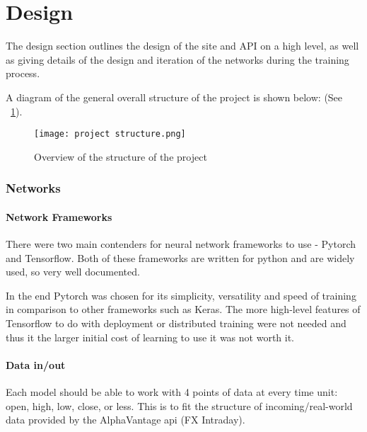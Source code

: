 \newpage
\part{Design}

    \graphicspath{{images/design/}}

    The design section outlines the design of the site and API on a high level, as well as giving details of the design and iteration of the networks during the training process.

    A diagram of the general overall structure of the project is shown below: (See ~\ref{fig:project_structure}).

    \begin{figure}[htbp]
        \centering
        \texttt{[image: project structure.png]}
        \caption{Overview of the structure of the project}
        \label{fig:project_structure}
    \end{figure}

    \newpage

    \section{Networks}
        
        \subsection{Network Frameworks}
        There were two main contenders for neural network frameworks to use - Pytorch and Tensorflow. Both of these frameworks are written for python and are widely used, so very well documented.

        In the end Pytorch was chosen for its simplicity, versatility and speed of training in comparison to other frameworks such as Keras. The more high-level features of Tensorflow to do with deployment or distributed training were not needed and thus it the larger initial cost of learning to use it was not worth it.


        \subsection{Data in/out}

        Each model should be able to work with 4 points of data at every time unit: open, high, low, close, or less. This is to fit the structure of incoming/real-world data provided by the AlphaVantage api (FX Intraday). 

